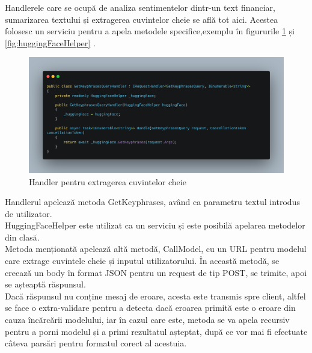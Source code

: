 Handlerele care se ocupă de analiza sentimentelor dintr-un text financiar, sumarizarea textului și extragerea cuvintelor cheie se află tot aici. Acestea folosesc un serviciu pentru a apela metodele specifice,exemplu în figururile \ref{fig:getKeyphrasesHelper} și \ref{fig:huggingFaceHelper} .
\begin{figure}[ht]
	\centering
	\includegraphics[width=150mm]{figs/getKeyphrasesHelper.png}
	\caption{Handler pentru extragerea cuvintelor cheie}
	\label{fig:getKeyphrasesHelper}
\end{figure}

Handlerul apelează metoda GetKeyphrases, având ca parametru textul introdus de utilizator. \\ HuggingFaceHelper este utilizat ca un serviciu și este posibilă apelarea metodelor din clasă. \\
Metoda menționată apelează altă metodă, CallModel, cu un URL pentru modelul care extrage cuvintele cheie și inputul utilizatorului. În această metodă, se creează un body în format JSON pentru un request de tip POST,
se trimite, apoi se așteaptă răspunsul. \\ 

Dacă răspunsul nu conține mesaj de eroare, acesta este transmis spre client, altfel se face o extra-validare pentru a detecta dacă eroarea primită este o eroare din cauza încărcării modelului, iar în cazul care este,
metoda se va apela recursiv pentru a porni modelul și a primi rezultatul așteptat, după ce vor mai fi efectuate câteva parsări pentru formatul corect al acestuia. 

